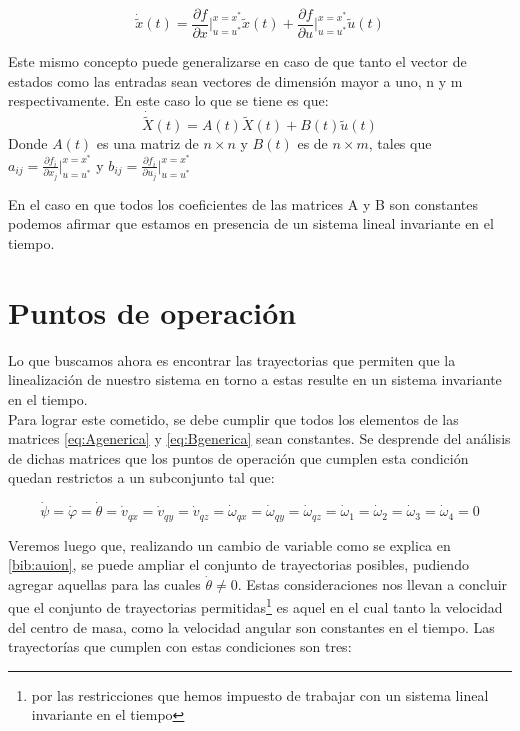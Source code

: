 \documentclass[main]{subfiles}
\begin{document}
\begin{equation}
\dot{\tilde{x}}(t)=\frac{\partial f}{\partial x}\vert_{u=u^*}^{x=x^*}\tilde{x}(t)+\frac{\partial f}{\partial u}\vert_{u=u^*}^{x=x^*}\tilde{u}(t)
\end{equation}

Este mismo concepto puede generalizarse en caso de que tanto el vector de estados como las entradas sean vectores de dimensi\'on mayor a uno, n y m respectivamente. En este caso lo que se tiene es que:
\begin{equation}
\dot{\tilde{X}}(t)=A(t)\tilde{X}(t)+B(t)\tilde{u}(t)
\end{equation}
Donde $A(t)$ es una matriz de $n \times n$ y $B(t)$ es de $n \times m$, tales que $a_{ij}= \frac{\partial f_i}{\partial x_j}\vert_{u=u^*}^{x=x^*}$ y  $b_{ij}= \frac{\partial f_i}{\partial u_j}\vert_{u=u^*}^{x=x^*}$

En el caso en que todos los coeficientes de las matrices A y B son constantes podemos afirmar que estamos en presencia de un sistema lineal invariante en el tiempo. 

\section{Puntos de operaci\'on}
Lo que buscamos ahora es encontrar las trayectorias que permiten que la linealizaci\'on de nuestro sistema en torno a estas resulte en un sistema invariante en el tiempo.\\

Para lograr este cometido, se debe cumplir que todos los elementos de las matrices \ref{eq:Agenerica} y \ref{eq:Bgenerica} sean constantes. Se desprende del an\'alisis de dichas matrices que los puntos de operaci\'on que cumplen esta condici\'on quedan restrictos a un subconjunto tal que: 

\begin{equation}
\dot{\psi}=\dot{\varphi}=\dot{\theta}=\dot{v}_{qx}=\dot{v}_{qy}=\dot{v}_{qz}=\dot{\omega}_{qx}=\dot{\omega}_{qy}=\dot{\omega}_{qz}=\dot{\omega}_1=\dot{\omega}_2=\dot{\omega}_3=\dot{\omega}_4=0
\end{equation}

Veremos luego que, realizando un cambio de variable como se explica en \ref{bib:auion}, se puede ampliar el conjunto de trayectorias posibles, pudiendo agregar aquellas para las cuales $\dot{\theta} \neq 0$. Estas consideraciones nos llevan a concluir que el conjunto de trayectorias permitidas\footnote{por las restricciones que hemos impuesto de trabajar con un sistema lineal invariante en el tiempo} es aquel en el cual tanto la velocidad del centro de masa, como la velocidad angular son constantes en el tiempo. Las trayector\'ias que cumplen con estas condiciones son tres:
\end{document}
